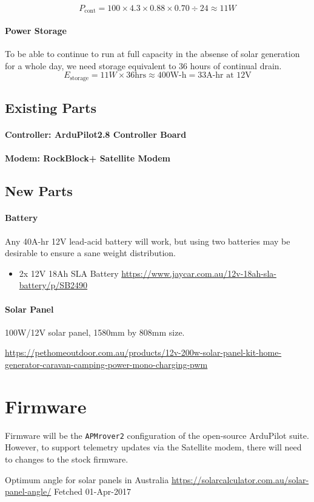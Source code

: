 $$
P_{\text{cont}} = 100 \times 4.3 \times 0.88 \times 0.70 \div 24 \approx 11W
$$

\paragraph{Power Storage}
To be able to continue to run at full capacity in the absense of solar generation for a whole day, we need storage equivalent to 36 hours of continual drain.
$$
E_{\text{storage}} = 11W \times 36\text{hrs} \approx 400\text{W-h} = 33\text{A-hr at 12V}
$$

\subsection{Existing Parts}

\paragraph{Controller: ArduPilot2.8 Controller Board}

\paragraph{Modem: RockBlock+ Satellite Modem}

\subsection{New Parts}

\paragraph{Battery}
Any 40A-hr 12V lead-acid battery will work, but using two batteries may be desirable to ensure a sane weight distribution.

\begin{itemize}
\item{2x 12V 18Ah SLA Battery} 
\url{https://www.jaycar.com.au/12v-18ah-sla-battery/p/SB2490}
\end{itemize}

\paragraph{Solar Panel}
100W/12V solar panel, 1580mm by 808mm size. 

\url{https://pethomeoutdoor.com.au/products/12v-200w-solar-panel-kit-home-generator-caravan-camping-power-mono-charging-pwm}

\section{Firmware}
Firmware will be the \texttt{APMrover2} configuration of the open-source ArduPilot suite. However, to support telemetry updates via the Satellite modem, there will need to changes to the stock firmware.

\begin{thebibliography}{9}
 Optimum angle for solar panels in Australia
 \url{https://solarcalculator.com.au/solar-panel-angle/}
 Fetched 01-Apr-2017
\end{thebibliography}


